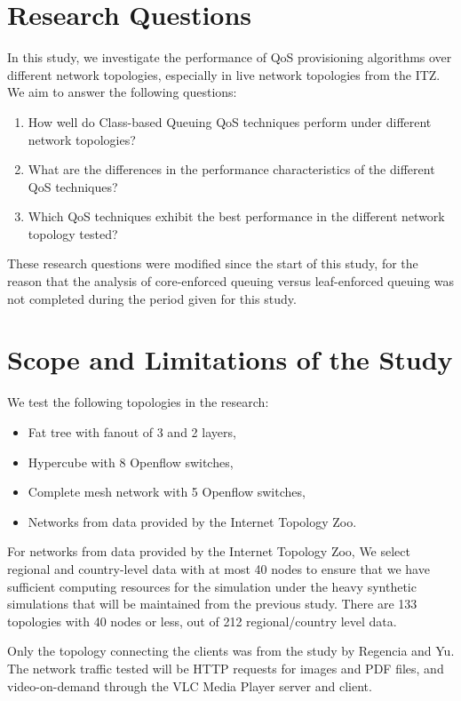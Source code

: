 \section{Research Questions}
In this study, we investigate the performance of QoS provisioning algorithms over different network topologies, especially in live network topologies from the ITZ. We aim to answer the following questions:

\begin{enumerate}
    \item How well do Class-based Queuing QoS techniques perform under different network topologies?
    \item What are the differences in the performance characteristics of the different QoS techniques?
    \item Which QoS techniques exhibit the best performance in the different network topology tested?
\end{enumerate}

These research questions were modified since the start of this study, for the reason that the analysis of core-enforced queuing versus leaf-enforced queuing was not completed during the period given for this study.

\section{Scope and Limitations of the Study}

We test the following topologies in the research:
\begin{itemize}
    \item Fat tree with fanout of 3 and 2 layers,
    \item Hypercube with 8 Openflow switches,
    \item Complete mesh network with 5 Openflow switches,
    \item Networks from data provided by the Internet Topology Zoo.
\end{itemize}

For networks from data provided by the Internet Topology Zoo, We select regional and country-level data with at most 40 nodes to ensure that we have sufficient computing resources for the simulation under the heavy synthetic simulations that will be maintained from the previous study. There are 133 topologies with 40 nodes or less, out of 212 regional/country level data. 

Only the topology connecting the clients was from the study by Regencia and Yu. The network traffic tested will be HTTP requests for images and PDF files, and video-on-demand through the VLC Media Player server and client.
    
